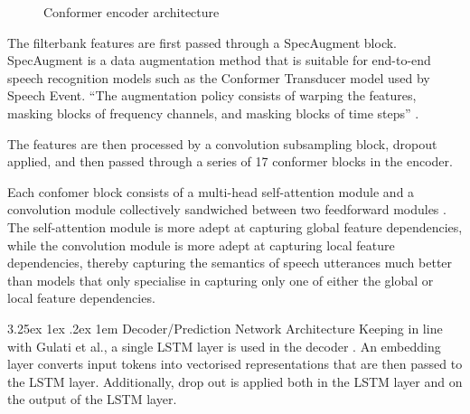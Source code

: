 \documentclass{CSSRforAfrica}
\makeatletter
\renewcommand\paragraph{\@startsection{paragraph}{4}{0pt}%
  {3.25ex \@plus1ex \@minus.2ex}%
  {1em}%
  {\normalfont\normalsize\itshape}}
\makeatother
\begin{document}
\begin{figure}[thb]
\begin{center}
\end{center}
\caption{Conformer encoder architecture \cite{gulati_conformer_2020}}
\label{fig:conformer-encoder}
\end{figure}

The filterbank features are first passed through a SpecAugment block. SpecAugment is a data augmentation method that is suitable for end-to-end speech recognition models such as the Conformer Transducer model used by Speech Event. ``The augmentation policy consists of warping the features, masking blocks of frequency channels, and masking blocks of time steps'' \cite{park_specaugment_2019}.

The features are then processed by a convolution subsampling block, dropout applied, and then passed through a series of 17 conformer blocks in the encoder.

Each confomer block consists of a multi-head self-attention module and a convolution module collectively sandwiched between two feedforward modules \cite{gulati_conformer_2020}. The self-attention module is more adept at capturing global feature dependencies, while the convolution module is more adept at capturing local feature dependencies, thereby capturing the semantics of speech utterances much better than models that only specialise in capturing only one of either the global or local feature dependencies.

\newpage
\paragraph{Decoder/Prediction Network Architecture}
Keeping in line with Gulati et al., a single LSTM layer is used in the decoder \cite{gulati_conformer_2020}. An embedding layer converts input tokens into vectorised representations that are then passed to the LSTM layer. Additionally, drop out is applied both in the LSTM layer and on the output of the LSTM layer.
\end{document}
